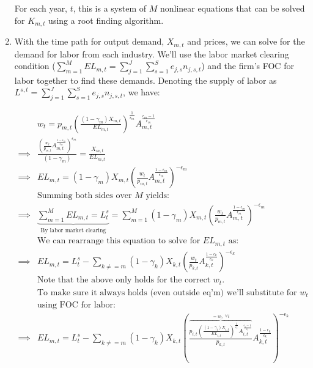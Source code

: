 \documentclass[letterpaper,12pt]{article}
\theoremstyle{definition}
\begin{document}
\begin{spacing}{1.5}
\begin{enumerate}
	For each year, $t$, this is a system of $M$ nonlinear equations that can be solved for $K_{m,t}$ using a root finding algorithm.
	
\item With the time path for output demand, $X_{m,t}$ and prices, we can solve for the demand for labor from each industry.  We'll use the labor market clearing condition ($\sum_{m=1}^{M} EL_{m,t}=\sum_{j=1}^{J}\sum_{s=1}^{S}e_{j,s} n_{j,s,t}$) and the firm's FOC for labor together to find these demands.  Denoting the supply of labor as $L^{s,t}=\sum_{j=1}^{J}\sum_{s=1}^{S} e_{j,s}n_{j,s,t}$, we have:


	\begin{equation}
	\begin{split}
	& w_{t} = p_{m,t}\left(\frac{(1-\gamma_{m})X_{m,t}}{EL_{m,t}}\right)^{\frac{1}{\epsilon_{m}}}A_{m,t}^{\frac{\epsilon_{m}-1}{\epsilon_{m}}} \\
	\implies & \frac{\left(\frac{w_{t}}{p_{m,t}}A_{m,t}^{\frac{1-\epsilon_{m}}{\epsilon_{m}}}\right)^{\epsilon_{m}}}{(1-\gamma_{m})} = \frac{X_{m,t}}{EL_{m,t}} \\
	\implies &  EL_{m,t} =(1- \gamma_{m})X_{m,t} \left(\frac{w_{t}}{p_{m,t}}A_{m,t}^{\frac{1-\epsilon_{m}}{\epsilon_{m}}}\right)^{-\epsilon_{m}} \\
	& \text{Summing both sides over $M$ yields:} \\
	\implies &  \underbrace{\sum_{m=1}^{M} EL_{m,t}= L^{s}_{t}}_{\text{By labor market clearing}} =\sum_{m=1}^{M} (1- \gamma_{m})X_{m,t} \left(\frac{w_{t}}{p_{m,t}}A_{m,t}^{\frac{1-\epsilon_{m}}{\epsilon_{m}}}\right)^{-\epsilon_{m}} \\
	& \text{We can rearrange this equation to solve for $EL_{m,t}$ as:}\\
	\implies & EL_{m,t} = L^{s}_{t} -\sum_{k \neq=m} (1-\gamma_{k})X_{k,t} \left(\frac{w_{t}}{p_{k,t}}A_{k,t}^{\frac{1-\epsilon_{k}}{\epsilon_{k}}}\right)^{-\epsilon_{k}}\\
	& \text{Note that the above only holds for the correct $w_{t}$.  }\\
	& \text{To make sure it always holds (even outside eq'm) we'll substitute for $w_{t}$} \\
	& \text{using FOC for labor:} \\
	\implies & EL_{m,t} = L^{s}_{t} -\sum_{k \neq=m} (1- \gamma_{k})X_{k,t} \left(\frac{\overbrace{p_{i,t}\left(\frac{(1-\gamma_{i})X_{i,t}}{EL_{i,t}}\right)^{\frac{1}{\epsilon_{i}}}A_{i,t}^{\frac{\epsilon_{i}-1}{\epsilon_{i}}}}^{=w_{t}, \ \forall i}}{p_{k,t}}A_{k,t}^{\frac{1-\epsilon_{k}}{\epsilon_{k}}}\right)^{-\epsilon_{k}}\\
	\end{split}
	\end{equation}


\end{enumerate}
\end{spacing}
\end{document}
